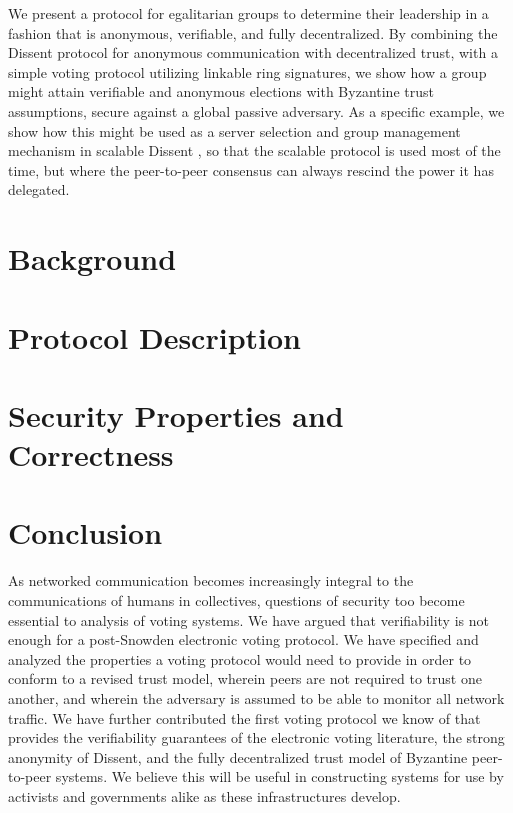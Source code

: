 \documentclass[finalcopy,nolof,nolot]{srpaper}
\begin{document}
We present a protocol for egalitarian groups to determine their leadership in a
fashion that is anonymous, verifiable, and fully decentralized.  By combining
the Dissent protocol for anonymous communication with decentralized
trust\cite{p2pd}, with a simple voting protocol utilizing linkable ring
signatures\cite{lrs}, we show how a group might attain verifiable and anonymous
elections with Byzantine trust assumptions, secure against a global passive
adversary.  As a specific example, we show how this might be used as a server
selection and group management mechanism in scalable Dissent \cite{din}, so that
the scalable protocol is used most of the time, but where the peer-to-peer
consensus can always rescind the power it has delegated.

\chapter{Background}\label{Chapter:Background}


% 
%
% 
%
\chapter{Protocol Description}\label{Chapter:Protocol}


\chapter{Security Properties and Correctness}\label{Chapter:Proofs}


\chapter{Conclusion}\label{Chapter:Conclusion}
As networked communication becomes increasingly integral to the communications
of humans in collectives, questions of security too become essential to analysis
of voting systems. We have argued that verifiability is not enough for a
post-Snowden electronic voting protocol. We have specified and analyzed the
properties a voting protocol would need to provide in order to conform to a
revised trust model, wherein peers are not required to trust one another, and
wherein the adversary is assumed to be able to monitor all network traffic. We
have further contributed the first voting protocol we know of that provides the
verifiability guarantees of the electronic voting literature, the strong
anonymity of Dissent, and the fully decentralized trust model of Byzantine
peer-to-peer systems. We believe this will be useful in constructing systems for
use by activists and governments alike as these infrastructures develop.
\end{document}
